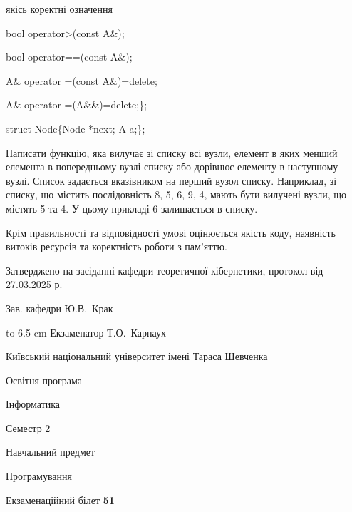 \documentclass[12pt, ukrainian]{article}
\begin{document}
{\quad  якісь коректні означення 

\quad  bool operator>(const A\&); 

\quad  bool operator==(const A\&); 

\quad A\& operator =(const A\&)=delete; 

\quad  A\& operator =(A\&\&)=delete;\};

struct Node\{Node *next; A a;\};

 Написати функцію, яка вилучає зі списку всі вузли, елемент в яких менший елемента в попередньому вузлі списку або дорівнює елементу в наступному вузлі. Список задається вказівником на перший вузол списку. Наприклад, зі списку, що містить послідовність 8, 5, 6, 9, 4, мають бути вилучені вузли, що містять 5 та 4. У цьому прикладі 6 залишається в списку.

Крім правильності та відповідності умові оцінюється якість коду, наявність витоків ресурсів та коректність роботи з пам'яттю. 

}
{\smallskip\smallskip \begin {scriptsize} Затверджено на засіданні кафедри теоретичної кібернетики, протокол   від   27.03.2025 р.\par\smallskip\smallskip\smallskip\smallskip
{\parbox {6.5 cm} {Зав. кафедри \dotfill Ю.В.~Крак}}\hspace {0.7cm} {\hbox to 6.5 cm { Екзаменатор \dotfill Т.О.~Карнаух}} \end{scriptsize}}
\newpage
{{\begin {scriptsize}\par
{ \center  Київський національний університет імені Тараса Шевченка \par}
{\parbox {5 cm}{Освітня програма \hfill}{\parbox {7 cm}{Інформатика\hfill}}\parbox {6 cm}{\hfill Семестр 2}}\par
{\parbox {5 cm} {Навчальний предмет \hfill}\parbox {7 cm}{Програмування \hfill}\parbox {6cm}{\hfill}\par}\vspace{-15pt} \end{scriptsize}}{\center Екзаменаційний білет \No \textbf { 51 }\par}}
\end{document}
